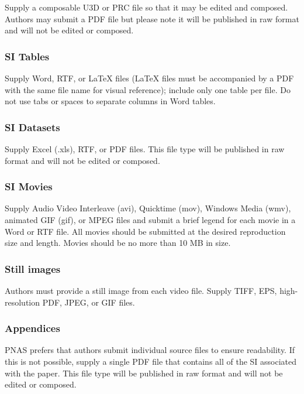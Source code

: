 \documentclass[9pt,twocolumn,twoside,lineno]{pnas-new}
\begin{document}
Supply a composable U3D or PRC file so that it may be edited and composed. Authors may submit a PDF file but please note it will be published in raw format and will not be edited or composed.

\subsubsection*{SI Tables}

Supply Word, RTF, or LaTeX files (LaTeX files must be accompanied by a PDF with the same file name for visual reference); include only one table per file. Do not use tabs or spaces to separate columns in Word tables.

\subsubsection*{SI Datasets} 

Supply Excel (.xls), RTF, or PDF files. This file type will be published in raw format and will not be edited or composed. 

\subsubsection*{SI Movies}

Supply Audio Video Interleave (avi), Quicktime (mov), Windows Media (wmv), animated GIF (gif), or MPEG files and submit a brief legend for each movie in a Word or RTF file. All movies should be submitted at the desired reproduction size and length. Movies should be no more than 10 MB in size. 

\subsubsection*{Still images}

Authors must provide a still image from each video file. Supply TIFF, EPS, high-resolution PDF, JPEG, or GIF files. 

\subsubsection*{Appendices}

PNAS prefers that authors submit individual source files to ensure readability. If this is not possible, supply a single PDF file that contains all of the SI associated with the paper. This file type will be published in raw format and will not be edited or composed.
\end{document}
